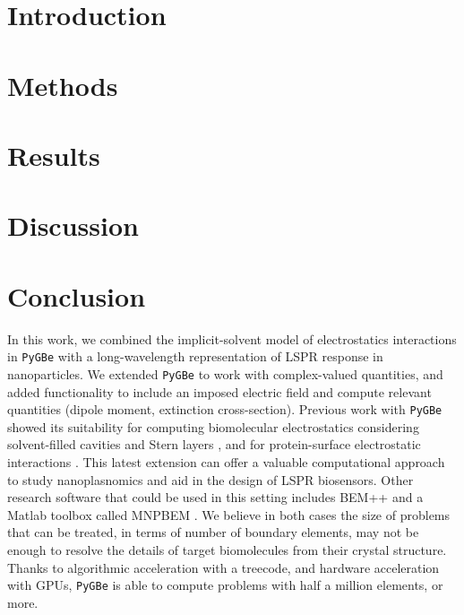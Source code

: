 \documentclass[aps, twocolumn]{revtex4-2}
\newcommand{\pygbe}{\texttt{PyGBe}\xspace}
\begin{document}
\maketitle


\section{Introduction}\label{sec:intro}


\section{Methods}\label{sec:methods}
 

\section{Results} \label{sec:results}


\section{Discussion} \label{sec:discussion}


\section{Conclusion}
%

In this work, we combined the implicit-solvent model of electrostatics interactions in \pygbe 
with a long-wavelength representation of LSPR response in nanoparticles. 
We extended \pygbe to work with complex-valued quantities, and added functionality to 
include an imposed electric field and compute relevant quantities 
(dipole moment, extinction cross-section). 
Previous work with \pygbe showed its suitability for computing 
biomolecular electrostatics considering solvent-filled cavities and Stern layers \cite{CooperBardhanBarba2013}, 
and for protein-surface electrostatic interactions \cite{CooperBarba2016}.
This latest extension can offer a valuable computational approach to study nanoplasnomics and aid in the design of LSPR biosensors. 
Other research software that could be used in this setting includes  
BEM++ \cite{SmigajETal2015} and a Matlab toolbox called MNPBEM \cite{HohenesterTrugler2012}. 
We believe in both cases the size of problems that can be treated, in terms of number of boundary elements, may not be enough to resolve the details of target biomolecules from their crystal structure. 
Thanks to algorithmic acceleration with a treecode, and hardware acceleration with GPUs, \pygbe is able to compute problems with half a million elements, or more.
\end{document}
